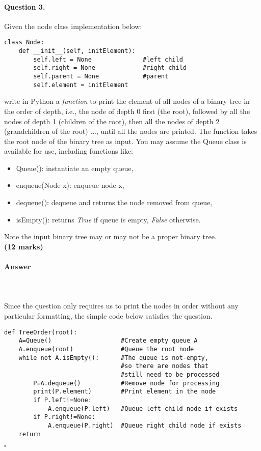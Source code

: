 \documentclass[12pt]{article}
\newcommand{\EOQ}{\hfill $\square$}
\begin{document}
\paragraph{Question 3.} Given the node class implementation below:
\begin{verbatim}
class Node:
    def __init__(self, initElement):
        self.left = None              #left child
        self.right = None             #right child
        self.parent = None            #parent
        self.element = initElement
\end{verbatim}
write in Python a \textit{function} to print the element of all nodes of a binary tree in the order of depth, i.e., the node of depth 0 first (the root), followed by all the nodes of depth 1 (children of the root), then all the nodes of depth 2 (grandchildren of the root) ..., until all the nodes are printed. The function takes the root node of the binary tree as input. You may assume the Queue class is available for use, including functions like:
\begin{itemize}
\item Queue(): instantiate an empty queue,
\item enqueue(Node x): enqueue node x,
\item dequeue(): dequeue and returns the node removed from queue,
\item isEmpty(): returns \textit{True} if queue is empty, \textit{False} otherwise.
\end{itemize}
Note the input binary tree may or may not be a proper binary tree. \\\text{}\hfill \textbf{(12 marks)}
\paragraph{Answer}\mbox{}\\\\
Since the question only requires us to print the nodes in order without any particular formatting, the simple code below satisfies the question.\\
\begin{verbatim}
def TreeOrder(root):
    A=Queue()                   #Create empty queue A
    A.enqueue(root)             #Queue the root node
    while not A.isEmpty():      #The queue is not-empty,
                                #so there are nodes that 
                                #still need to be processed
        P=A.dequeue()           #Remove node for processing
        print(P.element)        #Print element in the node
        if P.left!=None:         
            A.enqueue(P.left)   #Queue left child node if exists
        if P.right!=None:        
            A.enqueue(P.right)  #Queue right child node if exists
    return
\end{verbatim}
\EOQ
\end{document}
